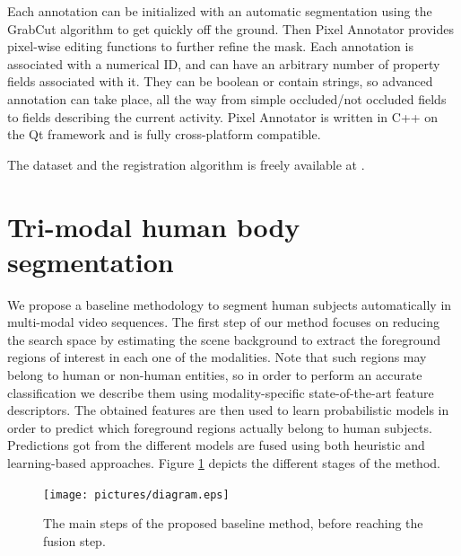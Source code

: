 \documentclass[10pt,twocolumn,letterpaper]{article}
\begin{document}
Each annotation can be initialized with an automatic segmentation using the GrabCut algorithm \cite{rother2004grabcut} to get quickly off the ground. Then Pixel Annotator provides pixel-wise editing functions to further refine the mask. Each annotation is associated with a numerical ID, and can have an arbitrary number of property fields associated with it. They can be boolean or contain strings, so advanced annotation can take place, all the way from simple occluded/not occluded fields to fields describing the current activity. Pixel Annotator is written in C++ on the Qt framework and is fully cross-platform compatible.

The dataset and the registration algorithm is freely available at \cite{vapgroup}.


\section{Tri-modal human body segmentation}
\label{sec:trimodalhumanbodysegmentation}


We propose a baseline methodology to segment human subjects automatically in multi-modal video sequences. The first step of our method focuses on reducing the search space by estimating the scene background to extract the foreground regions of interest in each one of the modalities. Note that such regions may belong to human or non-human entities, so in order to perform an accurate classification we describe them using  modality-specific state-of-the-art feature descriptors. The obtained features are then used to learn probabilistic models in order to predict which foreground regions actually belong to human subjects. Predictions got from the different models are fused using both heuristic and learning-based approaches. Figure \ref{fig:baseline} depicts the different stages of the method.

\begin{figure}[ht!]
	\centering
	\texttt{[image: pictures/diagram.eps]}
	\caption{The main steps of the proposed baseline method, before reaching the fusion step.}
	\label{fig:baseline}
\end{figure}

\end{document}
